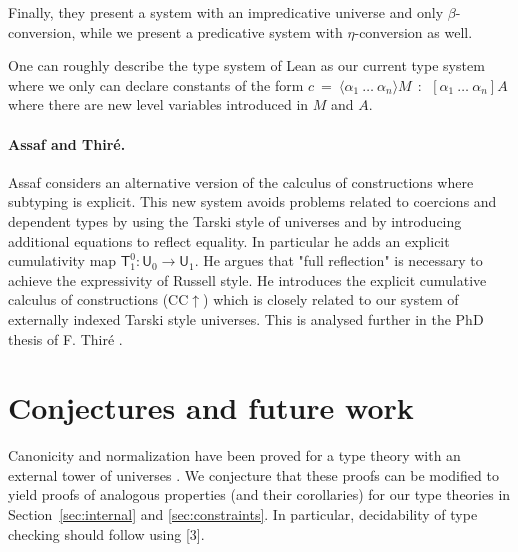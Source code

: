 \documentclass[11pt,a4paper]{article}
\theoremstyle{definition}
\newcommand{\UU}{\mathsf{U}}
\newcommand{\lam}[1]{{\langle}#1{\rangle}}
\newcommand{\T}{\mathsf{T}}
\begin{document}
Finally, they present a system with an impredicative universe and only $\beta$-conversion, while we present a predicative
system with $\eta$-conversion as well.
 
One can roughly describe the type system of Lean \cite{moura:lean,Carneiro19} as our current type system
where we only can declare constants of the form
$c~=~\lam{\alpha_1~\dots~\alpha_n}M~~:~~[\alpha_1~\dots~\alpha_n]A$ where there are new level variables introduced in $M$ and
$A$.




\paragraph{Assaf and Thir\'e.} 

Assaf \cite{Assaf14} considers an alternative version of the calculus of
constructions where subtyping is explicit. This new system avoids problems related to coercions and dependent types by using the Tarski style
of universes and by introducing additional equations to reflect equality. In particular he adds an explicit cumulativity map $\T^0_1 : \UU_0 \to \UU_1$. He argues that "full reflection" is necessary to achieve the expressivity of Russell style. He introduces the explicit cumulative calculus of constructions (CC$\uparrow$) which is closely related to our system of externally indexed Tarski style universes.
This is analysed further in the PhD thesis of F. Thir\'e \cite{Thire20}.

\section{Conjectures and future work}\label{sec:future}

Canonicity and normalization have been proved for a type theory with an external tower of universes \cite{coquand:tcs2019}. We conjecture that these proofs can be modified to yield proofs of analogous properties (and their corollaries) for our type theories in Section~\ref{sec:internal} and \ref{sec:constraints}.
%
In particular, decidability of type checking should follow using [3].
\end{document}
